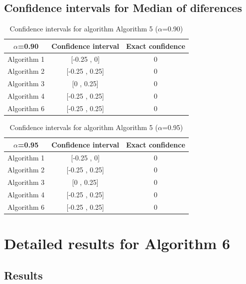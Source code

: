 \documentclass[a4paper,10pt]{article}
\begin{document}
\subsection{Confidence intervals for Median of diferences}

\begin{table}[!htp]
\centering\small
\begin{tabular}{
|c|c|c|}
\hline
 $\alpha$=0.90 & Confidence interval & Exact confidence \\ \hline 
Algorithm 1 & [-0.25 , 0] & 0\\ \hline 
Algorithm 2 & [-0.25 , 0.25] & 0\\ \hline 
Algorithm 3 & [0 , 0.25] & 0\\ \hline 
Algorithm 4 & [-0.25 , 0.25] & 0\\ \hline 
Algorithm 6 & [-0.25 , 0.25] & 0\\ \hline 

\end{tabular}
\caption{Confidence intervals for algorithm Algorithm 5 ($\alpha$=0.90)}
\end{table}
\begin{table}[!htp]
\centering\small
\begin{tabular}{
|c|c|c|}
\hline
 $\alpha$=0.95 & Confidence interval & Exact confidence \\ \hline 
Algorithm 1 & [-0.25 , 0] & 0\\ \hline 
Algorithm 2 & [-0.25 , 0.25] & 0\\ \hline 
Algorithm 3 & [0 , 0.25] & 0\\ \hline 
Algorithm 4 & [-0.25 , 0.25] & 0\\ \hline 
Algorithm 6 & [-0.25 , 0.25] & 0\\ \hline 

\end{tabular}
\caption{Confidence intervals for algorithm Algorithm 5 ($\alpha$=0.95)}
\end{table}

 \clearpage 


\section{Detailed results for Algorithm 6}


\subsection{Results}
\end{document}
